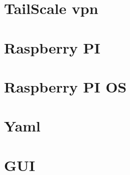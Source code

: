 \section{TailScale vpn}
\section{Raspberry PI}
\section{Raspberry PI OS}
\section{Yaml}
\section{GUI}




